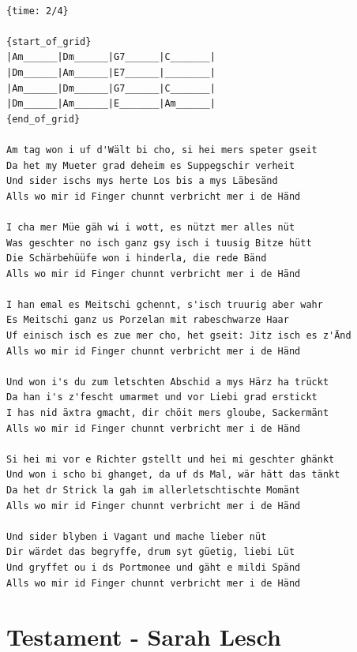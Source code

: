 \documentclass[]{book}
\let\stdsection\section
\renewcommand\section{\clearpage\stdsection}
\begin{document}
\begin{verbatim}

{time: 2/4}

{start_of_grid}
|Am______|Dm______|G7______|C_______|
|Dm______|Am______|E7______|________|
|Am______|Dm______|G7______|C_______|
|Dm______|Am______|E_______|Am______| 
{end_of_grid}

Am tag won i uf d'Wält bi cho, si hei mers speter gseit
Da het my Mueter grad deheim es Suppegschir verheit
Und sider ischs mys herte Los bis a mys Läbesänd
Alls wo mir id Finger chunnt verbricht mer i de Händ

I cha mer Müe gäh wi i wott, es nützt mer alles nüt
Was geschter no isch ganz gsy isch i tuusig Bitze hütt
Die Schärbehüüfe won i hinderla, die rede Bänd
Alls wo mir id Finger chunnt verbricht mer i de Händ

I han emal es Meitschi gchennt, s'isch truurig aber wahr
Es Meitschi ganz us Porzelan mit rabeschwarze Haar
Uf einisch isch es zue mer cho, het gseit: Jitz isch es z'Änd
Alls wo mir id Finger chunnt verbricht mer i de Händ

Und won i's du zum letschten Abschid a mys Härz ha trückt
Da han i's z'fescht umarmet und vor Liebi grad erstickt
I has nid äxtra gmacht, dir chöit mers gloube, Sackermänt
Alls wo mir id Finger chunnt verbricht mer i de Händ

Si hei mi vor e Richter gstellt und hei mi geschter ghänkt
Und won i scho bi ghanget, da uf ds Mal, wär hätt das tänkt
Da het dr Strick la gah im allerletschtischte Momänt
Alls wo mir id Finger chunnt verbricht mer i de Händ

Und sider blyben i Vagant und mache lieber nüt
Dir wärdet das begryffe, drum syt güetig, liebi Lüt
Und gryffet ou i ds Portmonee und gäht e mildi Spänd
Alls wo mir id Finger chunnt verbricht mer i de Händ
\end{verbatim}

\hypertarget{testament---sarah-lesch}{%
\section{Testament - Sarah Lesch}\label{testament---sarah-lesch}}
\end{document}
